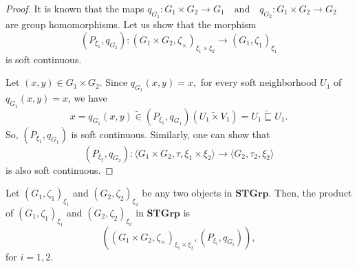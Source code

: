 \documentclass[preprint,12pt]{elsarticle}
\begin{document}
\begin{proof}
 It is known that the maps
\(
q_{G_1} : G_1 \times G_2 \to G_1 \quad \text{and} \quad q_{G_2} : G_1 \times G_2 \to G_2
\)
are group homomorphisms. Let us show that the morphism
\[
(P_{\xi_1}, q_{G_1}) : (G_1 \times G_2, \zeta_\times)_ {\xi_1 \times \xi_2} \to (G_1,\zeta_1 )_{\xi_1}
\]
is soft continuous.

Let \( (x, y) \in G_1 \times G_2 \). Since
\(
q_{G_1}(x, y) = x,
\)
for every soft neighborhood $U_1$ of $q_{G_1}(x,y) = x$, we have
\[
x=q_{G_1}(x,y) \widetilde{\in} (P_{\xi_1},q_{G_1})(U_1 \widetilde{\times} V_1) =U_1  \widetilde{\sqsubseteq}U_1.
\]
So, $(P_{\xi_1}, q_{G_1})$ is soft continuous.
Similarly, one can show that
\[
(P_{\xi_2}, q_{G_2}) : \langle G_1 \times G_2, \tau, \xi_1 \times \xi_2 \rangle \to \langle G_2, \tau_2, \xi_2 \rangle
\]
is also soft continuous.
\end{proof}
\begin{thm}
 Let \( (G_1,\zeta_1 )_{\xi_1}  \) and \( (G_2,\zeta_2 )_{\xi_2}\) be any two objects in $\mathbf{STGrp}$. Then, the product of \( (G_1,\zeta_1 )_{\xi_1}  \) and \( (G_2,\zeta_2 )_{\xi_2}\) in $\mathbf{STGrp}$ is $$((G_1 \times G_2, \zeta_\times)_ {\xi_1 \times \xi_2}, (P_{\xi_i}, q_{G_i})),$$ for $i=1,2$.
\end{thm}
\end{document}

